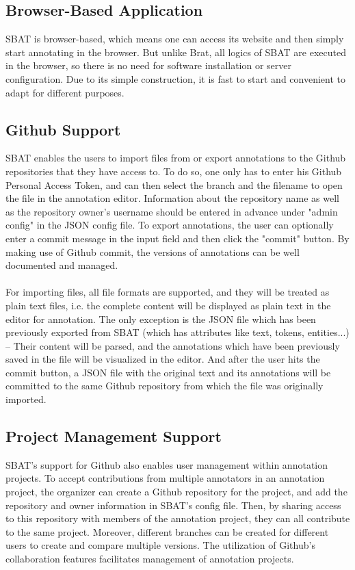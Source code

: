 \documentclass[12ptm a4paper]{article}
\begin{document}
\subsection{Browser-Based Application}
SBAT is browser-based, which means one can access its website and then simply start annotating in the browser. But unlike Brat, all logics of SBAT are executed in the browser, so there is no need for software installation or server configuration. Due to its simple construction, it is fast to start and convenient to adapt for different purposes.
\subsection{Github Support}
SBAT enables the users to import files from or export annotations to the Github repositories that they have access to. To do so, one only has to enter his Github Personal Access Token, and can then select the branch and the filename to open the file in the annotation editor. Information about the repository name as well as the repository owner's username should be entered in advance under "admin config" in the JSON config file. To export annotations, the user can optionally enter a commit message in the input field and then click the "commit" button. By making use of Github commit, the versions of annotations can be well documented and managed.\\
\\
For importing files, all file formats are supported, and they will be treated as plain text files, i.e. the complete content will be displayed as plain text in the editor for annotation. The only exception is the JSON file which has been previously exported from SBAT (which has attributes like text, tokens, entities...) -- Their content will be parsed, and the annotations which have been previously saved in the file will be visualized in the editor. And after the user hits the commit button, a JSON file with the original text and its annotations will be committed to the same Github repository from which the file was originally imported.
\subsection{Project Management Support}
SBAT's support for Github also enables user management within annotation projects. To accept contributions from multiple annotators in an annotation project, the organizer can create a Github repository for the project, and add the repository and owner information in SBAT's config file. Then, by sharing access to this repository with members of the annotation project, they can all contribute to the same project. Moreover, different branches can be created for different users to create and compare multiple versions. The utilization of Github's collaboration features facilitates management of annotation projects.
\newpage
\end{document}
